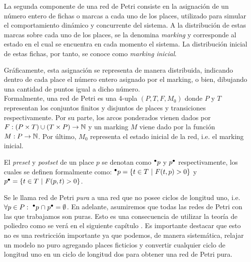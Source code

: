 La segunda componente de una red de Petri consiste en la asignación
de un número entero de fichas o marcas a cada uno de los places, 
utilizado para simular el comportamiento dinámico y concurrente del sistema.
A la distribución de estas marcas sobre cada uno de los places, se la denomina
\textit{marking} y corresponde al estado en el cual se encuentra en cada momento el sistema.
La distribución inicial de estas fichas, por tanto, se conoce como \textit{marking inicial}.

Gráficamente, esta asignación se representa de manera distribuida, indicando dentro 
de cada place el número entero asignado por el marking, o bien, dibujando una 
cantidad de puntos igual a dicho número.
\\

Formalmente, una red de Petri es una 4-upla $(P,T,F,M_0)$ donde $P$ y $T$\footnotemark[1]
representan los conjuntos finitos y disjuntos de places y transiciones respectivamente.
Por su parte, los arcos ponderados vienen dados por \mbox{$F:(P \times T) \cup (T \times P)  \to \mathbb{N}$}
y un marking $M$ viene dado por la función \mbox{$M:P \to \mathbb{N}$}.
Por último, $M_0$ representa el estado inicial de la red, i.e. el marking inicial.


El \textit{preset} y \textit{postset} de un place $p$ se denotan como $\mbox{$^\bullet p$}$ y $\mbox{$p^\bullet$}$
respectivamente, los cuales se definen formalmente como: $\mbox{$^\bullet p$} =  \{t \in T ~|~ F(t,p) > 0 \}$
y $\mbox{$p^\bullet$} = \{t \in T ~|~ F(p,t) > 0 \}$.

Se le llama red de Petri \emph{pura} a una red que no posee ciclos de longitud uno, i.e.
$\forall p \in P:~ {\mbox{$^\bullet p$}} \mathrel{\cap} {\mbox{$p^\bullet$}} = \emptyset$.
En adelante, asumiremos que todas las redes de Petri con las que trabajamos son puras.
Esto es una consecuencia de utilizar la teoría de poliedro como se verá en el siguiente capítulo
.
Es importante destacar que esto no es una 
restricción importante ya que podemos, de manera sistemática, relajar un modelo no puro agregando
places ficticios y convertir cualquier ciclo de longitud uno en un ciclo de longitud dos para
obtener una red de Petri pura.
\\


